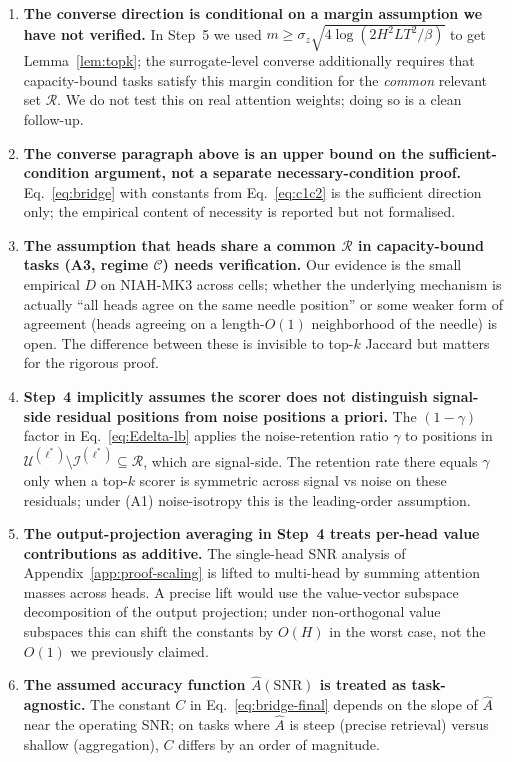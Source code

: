 \documentclass{article} %
\begin{document}
\begin{enumerate}
  alternative for readers who reject the surrogate-level amplification
  argument.
  \item \textbf{The converse direction is conditional on a margin
  assumption we have not verified.} In Step~5 we used $m \geq \sigma_z
  \sqrt{4 \log(2 H^2 L T^2 / \beta)}$ to get Lemma~\ref{lem:topk}; the
  surrogate-level converse additionally requires that capacity-bound
  tasks satisfy this margin condition for the \emph{common} relevant
  set $\mathcal{R}$. We do not test this on real attention weights;
  doing so is a clean follow-up.
  \item \textbf{The converse paragraph above is an upper bound on the
  sufficient-condition argument, not a separate necessary-condition
  proof.} Eq.~\eqref{eq:bridge} with constants from
  Eq.~\eqref{eq:c1c2} is the sufficient direction only; the empirical
  content of necessity is reported but not formalised.
  \item \textbf{The assumption that heads share a common $\mathcal{R}$
  in capacity-bound tasks (A3, regime $\mathcal{C}$) needs verification.}
  Our evidence is the small empirical $D$ on NIAH-MK3 across cells;
  whether the underlying mechanism is actually ``all heads agree on the
  same needle position'' or some weaker form of agreement (heads
  agreeing on a length-$O(1)$ neighborhood of the needle) is open. The
  difference between these is invisible to top-$k$ Jaccard but matters
  for the rigorous proof.
  \item \textbf{Step~4 implicitly assumes the scorer does not
  distinguish signal-side residual positions from noise positions a
  priori.} The $(1 - \gamma)$ factor in Eq.~\eqref{eq:Edelta-lb} applies
  the noise-retention ratio $\gamma$ to positions in
  $\mathcal{U}^{(\ell^*)} \setminus \mathcal{I}^{(\ell^*)}
  \subseteq \mathcal{R}$, which are signal-side. The retention rate
  there equals $\gamma$ only when a top-$k$ scorer is symmetric across
  signal vs noise on these residuals; under (A1) noise-isotropy this is
  the leading-order assumption.
  \item \textbf{The output-projection averaging in Step~4 treats
  per-head value contributions as additive.} The single-head SNR
  analysis of Appendix~\ref{app:proof-scaling} is lifted to multi-head
  by summing attention masses across heads. A precise lift would use
  the value-vector subspace decomposition of the output projection;
  under non-orthogonal value subspaces this can shift the constants by
  $O(H)$ in the worst case, not the $O(1)$ we previously claimed.
  \item \textbf{The assumed accuracy function $\hat A(\mathrm{SNR})$ is
  treated as task-agnostic.} The constant $C$ in Eq.~\eqref{eq:bridge-final}
  depends on the slope of $\hat A$ near the operating SNR; on tasks where
  $\hat A$ is steep (precise retrieval) versus shallow (aggregation), $C$
  differs by an order of magnitude.
\end{enumerate}
\end{document}
